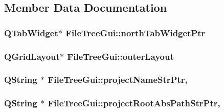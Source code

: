 \subsection{Member Data Documentation}
\hypertarget{class_file_tree_gui_ae44c6d73787d55eae9bed8e16ff9f34a}{
\subsubsection[{north\-Tab\-Widget\-Ptr}]{\setlength{\rightskip}{0pt plus 5cm}Q\-Tab\-Widget$\ast$ File\-Tree\-Gui\-::north\-Tab\-Widget\-Ptr\hspace{0.3cm}{\ttfamily [private]}}}\label{class_file_tree_gui_ae44c6d73787d55eae9bed8e16ff9f34a}
\hypertarget{class_file_tree_gui_aaf8b63a4775b1d46d635cdaef94b979a}{
\subsubsection[{outer\-Layout}]{\setlength{\rightskip}{0pt plus 5cm}Q\-Grid\-Layout$\ast$ File\-Tree\-Gui\-::outer\-Layout\hspace{0.3cm}{\ttfamily [private]}}}\label{class_file_tree_gui_aaf8b63a4775b1d46d635cdaef94b979a}
\hypertarget{class_file_tree_gui_a51591bd328287179146de851e7263b70}{
\subsubsection[{project\-Name\-Str\-Ptr}]{\setlength{\rightskip}{0pt plus 5cm}Q\-String $\ast$ File\-Tree\-Gui\-::project\-Name\-Str\-Ptr\hspace{0.3cm}{\ttfamily [static]}, {\ttfamily [private]}}}\label{class_file_tree_gui_a51591bd328287179146de851e7263b70}
\hypertarget{class_file_tree_gui_a9ce991f8f95f583aa5fb1bec7a9bcd4c}{
\subsubsection[{project\-Root\-Abs\-Path\-Str\-Ptr}]{\setlength{\rightskip}{0pt plus 5cm}Q\-String $\ast$ File\-Tree\-Gui\-::project\-Root\-Abs\-Path\-Str\-Ptr\hspace{0.3cm}{\ttfamily [static]}, {\ttfamily [private]}}}\label{class_file_tree_gui_a9ce991f8f95f583aa5fb1bec7a9bcd4c}
